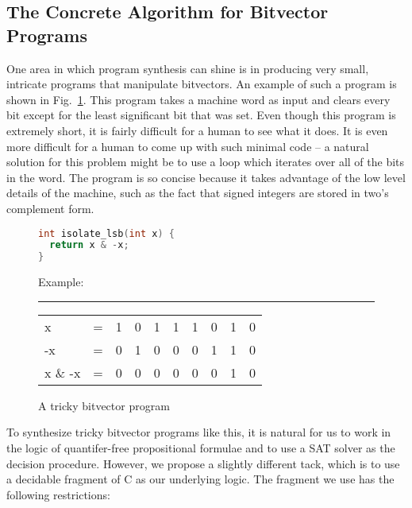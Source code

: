 \documentclass[a4paper]{llncs}
\begin{document}
\subsection{The Concrete Algorithm for Bitvector Programs}

One area in which program synthesis can shine is in producing very small,
intricate programs that manipulate bitvectors.  An example of such a program
is shown in Fig.~\ref{fig:bitvector-program}.  This program takes a machine word
as input and clears every bit except for the least significant bit that was set.
Even though this program is extremely short, it is fairly difficult for a human
to see what it does.  It is even more difficult for a human to come up with such
minimal code -- a natural solution for this problem might be to use a loop which
iterates over all of the bits in the word.  The program is so concise because it
takes advantage of the low level details of the machine, such as the fact that
signed integers are stored in two's complement form.

\begin{figure}
\centering
\begin{minipage}{0.45\linewidth}
 \begin{lstlisting}[language=C]
int isolate_lsb(int x) {
  return x & -x;
}
 \end{lstlisting}
\end{minipage}
\begin{minipage}{0.45\linewidth}
 
Example:

\hrule

\begin{tabular}{llcccccccc}
 x       & = & 1 & 0 & 1 & 1 & 1 & 0 & 1 & 0 \\
 -x      & = & 0 & 1 & 0 & 0 & 0 & 1 & 1 & 0 \\
 x \& -x & = & 0 & 0 & 0 & 0 & 0 & 0 & 1 & 0
\end{tabular}
\end{minipage}

 \label{fig:bitvector-program}
 \caption{A tricky bitvector program}
\end{figure}

To synthesize tricky bitvector programs like this, it is natural for us to work
in the logic of quantifer-free propositional formulae and to use a SAT solver as
the decision procedure.  However, we propose a slightly different tack, which is
to use a decidable fragment of C as our underlying logic.  The fragment we use
has the following restrictions:
\end{document}

